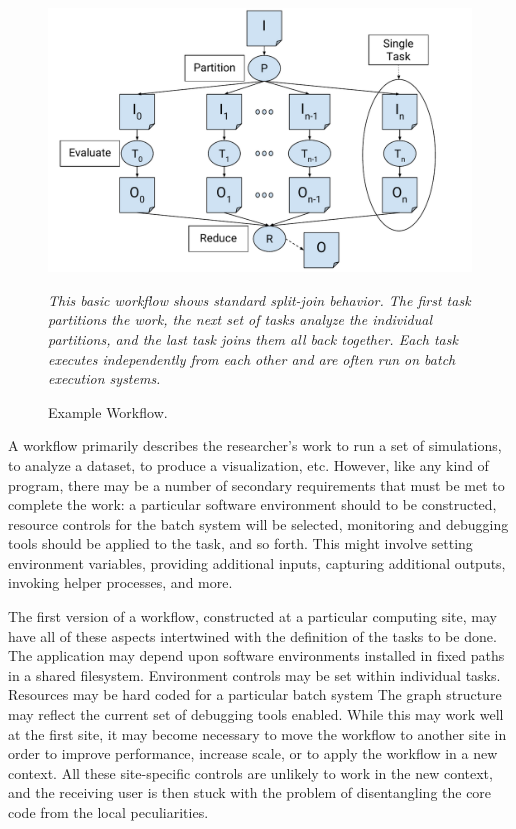 \documentclass[conference]{IEEEtran}
\begin{document}
\begin{figure}[t]
\includegraphics[width=\columnwidth]{graphics/example_workflow.pdf}
\caption{Example Workflow.}
\small
\emph{This basic workflow shows
standard split-join behavior. The first task partitions the work, the next set of tasks analyze the individual 
partitions, and the last task joins them all back 
together. Each task executes independently from each other
and are often run on batch execution systems.}
\label{fig:workflow}
\end{figure}


A workflow primarily describes the researcher's work
to run a set of simulations, 
to analyze a dataset, 
to produce a visualization, etc.
However, like any kind of program, there may be a number of secondary
requirements that must be met to complete the work:
a particular software environment should to be constructed,
resource controls for the batch system will be selected,
monitoring and debugging tools should be applied to the task,
and so forth.  This might involve  
setting environment variables,
providing additional inputs, capturing additional outputs,
invoking helper processes, and more.

The first version of a workflow, constructed at a particular computing site,
may have all of these aspects intertwined with the definition of the
tasks to be done.  
The application may depend upon
software environments installed in fixed paths in a shared filesystem.
Environment controls may be set within individual tasks.
Resources may be
hard coded for a particular batch system
The graph structure may reflect
the current set of debugging tools enabled.  
While this may work well at the
first site, it may become necessary to move the workflow to another
site in order to improve performance, increase scale, or to apply the workflow in a new context.
All these site-specific controls are unlikely to work in the new context,
and the receiving user is then stuck with the problem of disentangling the
core code from the local peculiarities.
\end{document}
